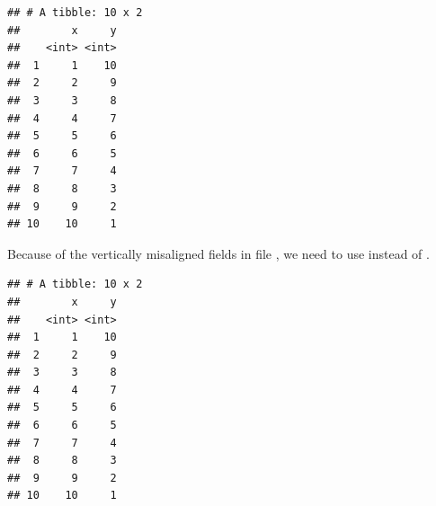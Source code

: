 \documentclass[krantz2,ChapterTOCs]{krantz}\usepackage{knitr}
\begin{document}
\begin{knitrout}\footnotesize
{}\color{fgcolor}\begin{kframe}
\begin{alltt}
\hlstd{(} \hlstd{=} \hlstd{)}
\end{alltt}


{\ttfamily\noindent\itshape\color{messagecolor}{\#\# Using ',' as decimal and '.' as grouping mark. Use read\_delim() for more control.}}

{\ttfamily\noindent\itshape\color{messagecolor}{\#\# Parsed with column specification:\\\#\# cols(\\\#\#\ \  x = col\_integer(),\\\#\#\ \  y = col\_integer()\\\#\# )}}\begin{verbatim}
## # A tibble: 10 x 2
##        x     y
##    <int> <int>
##  1     1    10
##  2     2     9
##  3     3     8
##  4     4     7
##  5     5     6
##  6     6     5
##  7     7     4
##  8     8     3
##  9     9     2
## 10    10     1
\end{verbatim}
\end{kframe}
\end{knitrout}

Because of the vertically misaligned fields in file , we need to use  instead of .
\begin{knitrout}\footnotesize
{}\color{fgcolor}\begin{kframe}
\begin{alltt}
\hlstd{(} \hlstd{=} \hlstd{,} \hlstd{)}
\end{alltt}


{\ttfamily\noindent\itshape\color{messagecolor}{\#\# Parsed with column specification:\\\#\# cols(\\\#\#\ \  x = col\_integer(),\\\#\#\ \  y = col\_integer()\\\#\# )}}\begin{verbatim}
## # A tibble: 10 x 2
##        x     y
##    <int> <int>
##  1     1    10
##  2     2     9
##  3     3     8
##  4     4     7
##  5     5     6
##  6     6     5
##  7     7     4
##  8     8     3
##  9     9     2
## 10    10     1
\end{verbatim}
\end{kframe}
\end{knitrout}
\end{document}
